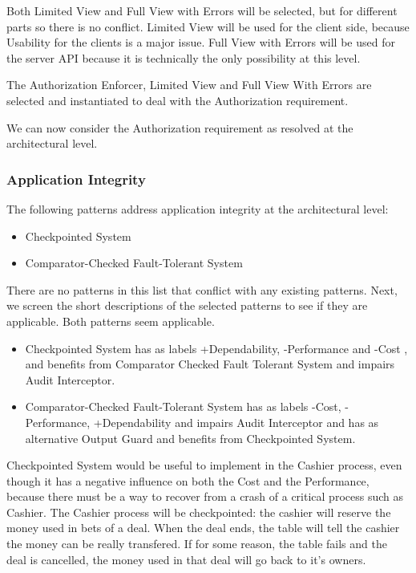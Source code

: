 \documentclass[a4paper,11pt]{report}
\begin{document}
Both Limited View and Full View with Errors will be selected, but for different parts so there is no conflict.
Limited View will be used for the client side, because Usability for the clients is a major issue. Full View with
Errors will be used for the server API because it is technically the only possibility at this level.

The Authorization Enforcer, Limited View and Full View With Errors are selected and instantiated 
to deal with the Authorization requirement.

We can now consider the Authorization requirement as resolved at the architectural level.

\subsubsection{Application Integrity}
\label{ArchitecturalApplicationIntegrity}
The following patterns address application integrity at the architectural level:
\begin{itemize}
\item Checkpointed System
\item Comparator-Checked Fault-Tolerant System
\end{itemize}

There are no patterns in this list that conflict with any existing patterns.
Next, we screen the short descriptions of the selected patterns to see if they are applicable. Both patterns seem
applicable.

\begin{itemize}
\item Checkpointed System has as labels +Dependability, -Performance and -Cost , and benefits from Comparator Checked
 Fault Tolerant System and impairs Audit Interceptor.

\item Comparator-Checked Fault-Tolerant System has as labels -Cost, -Performance, +Dependability and impairs Audit
Interceptor and has as alternative Output Guard and benefits from Checkpointed System.
\end{itemize}

Checkpointed System would be useful to implement in the Cashier process, even though it has a negative influence on both the Cost and the Performance,
because there must be a way to recover from a crash of a critical process such as Cashier. The Cashier process
will be checkpointed: the cashier will reserve the money used in bets of a deal. When the deal ends, the table 
will tell the cashier the money can be really transfered. If for some reason, the table fails and the deal is 
cancelled, the money used in that deal will go back to it's owners.
\end{document}
